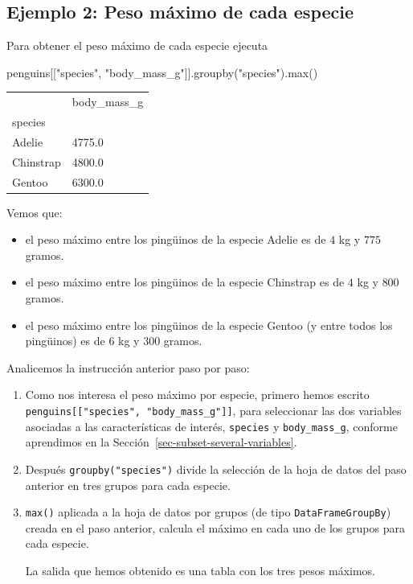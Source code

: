 \documentclass[
  a4paper,
  noprof,
  12pt,
  notoc,
  nosols,
  nobib]{mnye}
\newenvironment{Shaded}{\begin{snugshade}}{\end{snugshade}}
\newcommand{\BuiltInTok}[1]{\textcolor[rgb]{0.00,0.23,0.31}{#1}}
\newcommand{\NormalTok}[1]{\textcolor[rgb]{0.00,0.23,0.31}{#1}}
\newcommand{\StringTok}[1]{\textcolor[rgb]{0.13,0.47,0.30}{#1}}
\providecommand{\tightlist}{%
  \setlength{\itemsep}{0pt}\setlength{\parskip}{0pt}}\usepackage{longtable,booktabs,array}
\theoremstyle{definition}
\theoremstyle{remark}
\begin{document}
\subsection*{Ejemplo 2: Peso máximo de cada
especie}\label{ejemplo-2-peso-muxe1ximo-de-cada-especie}


Para obtener el peso máximo de cada especie ejecuta

\begin{Shaded}
\begin{Highlighting}[]
\NormalTok{penguins[[}\StringTok{"species"}\NormalTok{, }\StringTok{"body\_mass\_g"}\NormalTok{]].groupby(}\StringTok{"species"}\NormalTok{).}\BuiltInTok{max}\NormalTok{()}
\end{Highlighting}
\end{Shaded}

\begin{longtable}[]{@{}ll@{}}
\toprule\noalign{}
& body\_mass\_g \\
species & \\
\midrule\noalign{}
\endhead
\bottomrule\noalign{}
\endlastfoot
Adelie & 4775.0 \\
Chinstrap & 4800.0 \\
Gentoo & 6300.0 \\
\end{longtable}

Vemos que:

\begin{itemize}
\tightlist
\item
  el peso máximo entre los pingüinos de la especie Adelie es de \(4\) kg
  y \(775\) gramos.
\item
  el peso máximo entre los pingüinos de la especie Chinstrap es de \(4\)
  kg y \(800\) gramos.
\item
  el peso máximo entre los pingüinos de la especie Gentoo (y entre todos
  los pingüinos) es de \(6\) kg y \(300\) gramos.
\end{itemize}

Analicemos la instrucción anterior paso por paso:

\begin{enumerate}
\def\labelenumi{\arabic{enumi}.}
\item
  Como nos interesa el peso máximo por especie, primero hemos escrito
  \texttt{penguins{[}{[}"species",\ "body\_mass\_g"{]}{]}}, para
  seleccionar las dos variables asociadas a las características de
  interés, \texttt{species} y \texttt{body\_mass\_g}, conforme
  aprendimos en la Sección~\ref{sec-subset-several-variables}.
\item
  Después \texttt{groupby("species")} divide la selección de la hoja de
  datos del paso anterior en tres grupos para cada especie.
\item
  \texttt{max()} aplicada a la hoja de datos por grupos (de tipo
  \texttt{DataFrameGroupBy}) creada en el paso anterior, calcula el
  máximo en cada uno de los grupos para cada especie.

  La salida que hemos obtenido es una tabla con los tres pesos máximos.
\end{enumerate}
\end{document}
